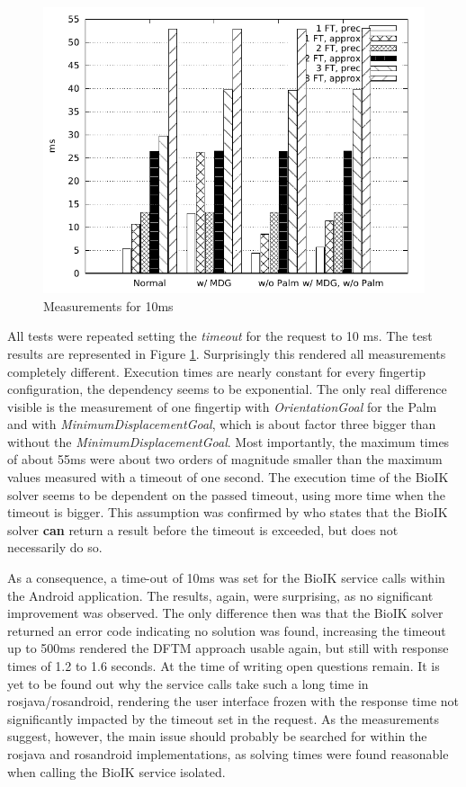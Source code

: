\begin{figure}
	\caption{\label{fig:eval:10ms}Measurements for 10ms}
	\begin{center}
		\includegraphics{assets/chpt_eval/10ms.pdf}
	\end{center}
\end{figure}

All tests were repeated setting the \textit{timeout} for the request to 10 ms. The test results are represented in Figure \ref{fig:eval:10ms}. Surprisingly this rendered all measurements completely different. Execution times are nearly constant for every fingertip configuration, the dependency seems to be exponential. The only real difference visible is the measurement of one fingertip with \textit{OrientationGoal} for the Palm and with \textit{MinimumDisplacementGoal}, which is about factor three bigger than without the \textit{MinimumDisplacementGoal}. Most importantly, the maximum times of about 55ms were about two orders of magnitude smaller than the maximum values measured with a timeout of one second. The execution time of the BioIK solver seems to be dependent on the passed timeout, using more time when the timeout is bigger. This assumption was confirmed by \citeauthor{Ruppel17}\cite{Ruppel17} who states that the BioIK solver \textbf{can} return a result before the timeout is exceeded, but does not necessarily do so.

As a consequence, a time-out of 10ms was set for the BioIK service calls within the Android application. The results, again, were surprising, as no significant improvement was observed. The only difference then was that the BioIK solver returned an error code indicating no solution was found, increasing the timeout up to 500ms rendered the DFTM approach usable again, but still with response times of 1.2 to 1.6 seconds. At the time of writing open questions remain. It is yet to be found out why the service calls take such a long time in rosjava/rosandroid, rendering the user interface frozen with the response time not significantly impacted by the timeout set in the request. As the measurements suggest, however, the main issue should probably be searched for within the rosjava and rosandroid implementations, as solving times were found reasonable when calling the BioIK service isolated.

